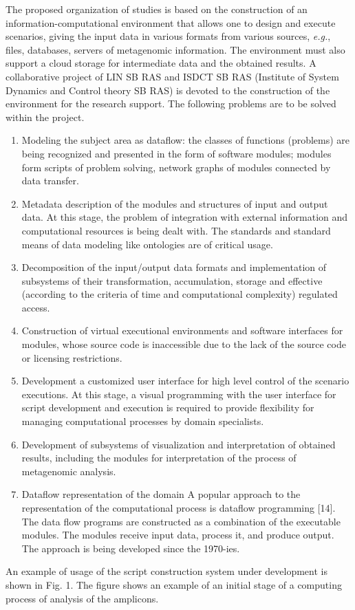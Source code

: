 \documentclass[conference,a4paper]{IEEEtran}
\begin{document}
The proposed organization of studies is based on the construction of an information-computational environment that allows one to design and execute scenarios, giving the input data in various formats from various sources, \emph{e.g.}, files, databases, servers of metagenomic information. The environment must also support a cloud storage for intermediate data and the obtained results.  A collaborative project of LIN SB RAS and ISDCT SB RAS (Institute of System Dynamics and Control theory SB RAS) is devoted to the construction of the environment for the research support.  The following problems are to be solved within the project.
\begin{enumerate}
\item Modeling the subject area as dataflow: the classes of
  functions (problems) are being recognized and presented in the form
  of software modules; modules form scripts of problem solving,
  network graphs of modules connected by data transfer.
\item Metadata description of the modules and structures of input and
  output data. At this stage, the problem
  of integration with external information and computational
  resources is being dealt with. The standards and standard means of data  modeling like ontologies are of critical usage.
\item Decomposition of
  the input/output data formats and implementation of subsystems of
  their transformation, accumulation, storage and effective (according
  to the criteria of time and computational complexity) regulated
  access.
\item Construction of virtual executional environments and
  software interfaces for modules, whose source code is inaccessible
  due to the lack of the source code or licensing restrictions.
\item Development a customized user interface for high level control of
  the scenario executions. At this stage, a visual programming with
  the user interface for script development and execution is required
  to provide flexibility for managing computational processes by
  domain specialists.
\item Development of subsystems of visualization
  and interpretation of obtained results, including the modules for
  interpretation of the process of metagenomic analysis.
\item Dataflow
  representation of the domain A popular approach to the
  representation of the computational process is dataflow programming
  [14]. The data flow programs are constructed as a combination of the
  executable modules. The modules receive input data, process it, and
  produce output. The approach is being developed since the 1970-ies.
\end{enumerate}
An example of usage of the script construction system under development is shown in Fig. 1. The figure shows an example of an initial stage of a computing process of analysis of the amplicons.
\end{document}
